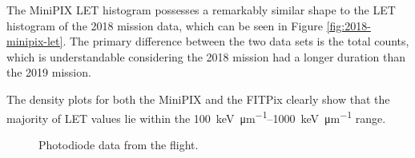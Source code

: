 The MiniPIX LET histogram possesses a remarkably similar shape to the LET histogram of the 2018 mission data, which can be seen in Figure \ref{fig:2018-minipix-let}.
The primary difference between the two data sets is the total counts, which is understandable considering the 2018 mission had a longer duration than the 2019 mission.

The density plots for both the MiniPIX and the FITPix clearly show that the majority of LET values lie within the \SIrange{100}{1000}{\kilo\eV\per\micro\meter} range.


\begin{figure}[h!]
\hfill
{}
\hfill
{}
\hfill
{}
\hfill
\caption{Photodiode data from the flight.}
\label{fig:photodiodes}
\end{figure}


